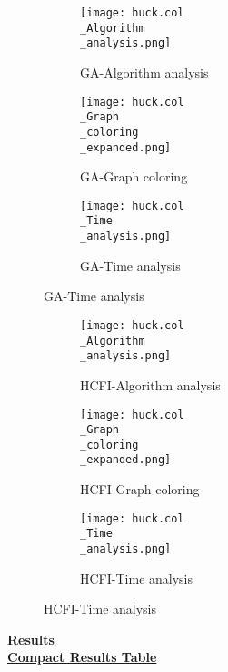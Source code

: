 \documentclass[10pt]{article}
\begin{document}
\graphicspath{{./Core1/Solutions/GA/huck.col}}
\begin{figure}[H]
\begin{subfigure}{.33\textwidth}
  \centering
  \texttt{[image: huck.col\\\_Algorithm\\\_analysis.png]}
  \caption{GA-Algorithm analysis}
   \label{fig:subfig1}
\end{subfigure}%
\begin{subfigure}{.33\textwidth}
  \centering
  \texttt{[image: huck.col\\\_Graph\\\_coloring\\\_expanded.png]}
  \caption{GA-Graph coloring}
  \label{fig:subfig2}
\end{subfigure}
\begin{subfigure}{.33\textwidth}
  \centering
  \texttt{[image: huck.col\\\_Time\\\_analysis.png]}
  \caption{GA-Time analysis}
  \end{subfigure}
\end{figure}

\graphicspath{{./Core1/Solutions/HCFI/huck.col}}
\begin{figure}[H]
\begin{subfigure}{.33\textwidth}
  \centering
  \texttt{[image: huck.col\\\_Algorithm\\\_analysis.png]}
  \caption{HCFI-Algorithm analysis}
   \label{fig:subfig1}
\end{subfigure}%
\begin{subfigure}{.33\textwidth}
  \centering
  \texttt{[image: huck.col\\\_Graph\\\_coloring\\\_expanded.png]}
  \caption{HCFI-Graph coloring}
  \label{fig:subfig2}
\end{subfigure}
\begin{subfigure}{.33\textwidth}
  \centering
  \texttt{[image: huck.col\\\_Time\\\_analysis.png]}
  \caption{HCFI-Time analysis}
  \end{subfigure}
\end{figure}
\vspace{2cm}
\begin{center}
\hyperlink{page.8}{\textbf{Results}}\\
\vspace{0.5cm}
\hyperlink{page.71}{\textbf{Compact Results Table}}
\end{center}
\pagebreak
\end{document}
